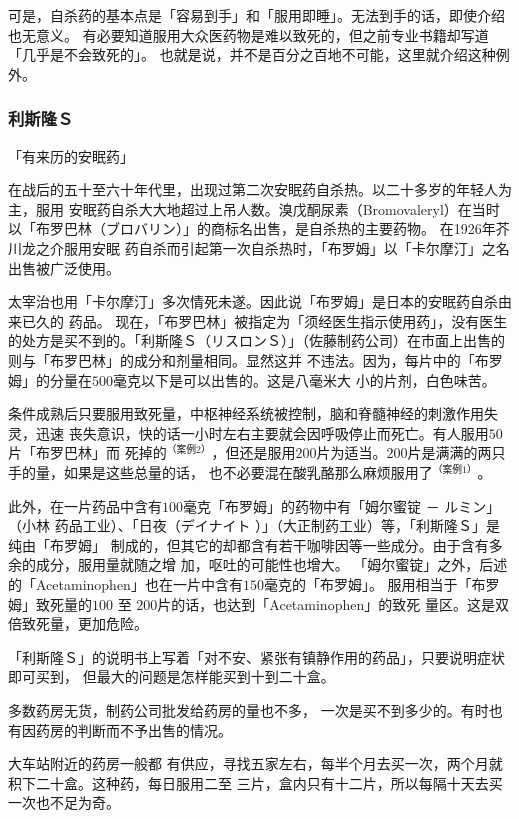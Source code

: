 \documentclass[UTF8]{ctexart}
\begin{document}
可是，自杀药的基本点是「容易到手」和「服用即睡」。无法到手的话，即使介绍也无意义。 有必要知道服用大众医药物是难以致死的，但之前专业书籍却写道「几乎是不会致死的」。 也就是说，并不是百分之百地不可能，这里就介绍这种例外。

\subsubsection{利斯隆Ｓ}
\begin{flushright}
「有来历的安眠药」
\end{flushright}

在战后的五十至六十年代里，出现过第二次安眠药自杀热。以二十多岁的年轻人为主，服用
安眠药自杀大大地超过上吊人数。溴戊酮尿素（Bromovaleryl）在当时以「布罗巴林（ブロバリン）」的商标名出售，是自杀热的主要药物。
在1926年芥川龙之介服用安眠 药自杀而引起第一次自杀热时，「布罗姆」以「卡尔摩汀」之名出售被广泛使用。

太宰治也用「卡尔摩汀」多次情死未遂。因此说「布罗姆」是日本的安眠药自杀由来已久的 药品。 现在，「布罗巴林」被指定为「须经医生指示使用药」，没有医生的处方是买不到的。「利斯隆Ｓ（リスロンＳ）」（佐藤制药公司）在市面上出售的则与「布罗巴林」的成分和剂量相同。显然这并 不违法。因为，每片中的「布罗姆」的分量在$500$毫克以下是可以出售的。这是八毫米大 小的片剂，白色味苦。

条件成熟后只要服用致死量，中枢神经系统被控制，脑和脊髓神经的刺激作用失灵，迅速
丧失意识，快的话一小时左右主要就会因呼吸停止而死亡。有人服用$50$片「布罗巴林」而
死掉的$^{（案例2）}$，但还是服用$200$片为适当。$200$片是满满的两只手的量，如果是这些总量的话，
也不必要混在酸乳酪那么麻烦服用了$^{（案例1）}$。

此外，在一片药品中含有$100$毫克「布罗姆」的药物中有「姆尔蜜锭 － ルミン」（小林 药品工业）、「日夜（デイナイト ）」（大正制药工业）等，「利斯隆Ｓ」是纯由「布罗姆」 制成的，但其它的却都含有若干咖啡因等一些成分。由于含有多余的成分，服用量就随之增 加，呕吐的可能性也增大。 「姆尔蜜锭」之外，后述的「Acetaminophen」也在一片中含有$150$毫克的「布罗姆」。 服用相当于「布罗姆」致死量的$100$ 至 $200$片的话，也达到「Acetaminophen」的致死 量区。这是双倍致死量，更加危险。

「利斯隆Ｓ」的说明书上写着「对不安、紧张有镇静作用的药品」，只要说明症状即可买到，
但最大的问题是怎样能买到十到二十盒。

多数药房无货，制药公司批发给药房的量也不多，
一次是买不到多少的。有时也有因药房的判断而不予出售的情况。

大车站附近的药房一般都
有供应，寻找五家左右，每半个月去买一次，两个月就积下二十盒。这种药，每日服用二至
三片，盒内只有十二片，所以每隔十天去买一次也不足为奇。
\end{document}
